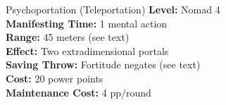 {Psychoportation (Teleportation)}
{
	\textbf{Level:}
	Nomad 4\\
	\textbf{Manifesting Time:}
	1 mental action\\
	\textbf{Range:}
	45 meters (see text)\\
	\textbf{Effect:}
	Two extradimensional portals\\
	\textbf{Saving Throw:}
	Fortitude negates (see text)\\
	\textbf{Cost:}
	20 power points\\
	\textbf{Maintenance Cost:}
	4 pp/round\\
}
